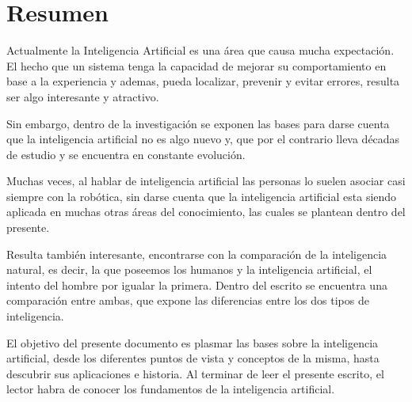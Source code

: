 \chapter*{Resumen}

Actualmente la Inteligencia Artificial es una área que causa mucha expectación. El hecho que un sistema tenga la capacidad de mejorar su comportamiento en base a la experiencia y ademas, pueda localizar, prevenir y evitar errores, resulta ser algo interesante y atractivo. \bigskip

Sin embargo, dentro de la investigación se exponen las bases para darse cuenta que la inteligencia artificial no es algo nuevo y, que por el contrario lleva décadas de estudio y se encuentra en constante evolución.

Muchas veces, al hablar de inteligencia artificial las personas lo suelen asociar casi siempre con la robótica, sin darse cuenta que la inteligencia artificial esta siendo aplicada en muchas otras áreas del conocimiento, las cuales se plantean dentro del presente.

Resulta también interesante, encontrarse con la comparación de la inteligencia natural, es decir, la que poseemos los humanos y la inteligencia artificial, el intento del hombre por igualar la primera. Dentro del escrito se encuentra una comparación entre ambas, que expone las diferencias entre los dos tipos de inteligencia. \bigskip

El objetivo del presente documento es plasmar las bases sobre la inteligencia artificial, desde los diferentes puntos de vista  y conceptos de la misma, hasta descubrir sus aplicaciones e historia. Al terminar de leer el presente escrito, el lector habra de conocer los fundamentos de la inteligencia artificial.